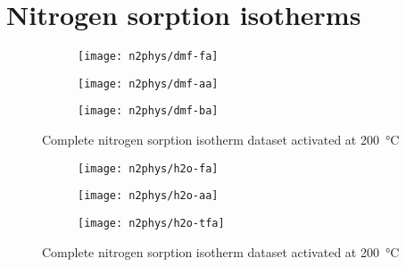 
\section{Nitrogen sorption isotherms}


\begin{figure}[htb]
    \centering

    \begin{subfigure}{0.4\linewidth}
        \texttt{[image: n2phys/dmf-fa]}%
        \label{appx:def:fgr:n2phys-dmf-fa}
    \end{subfigure}
    \begin{subfigure}{0.4\linewidth}
        \texttt{[image: n2phys/dmf-aa]}%
        \label{appx:def:fgr:n2phys-dmf-aa}
    \end{subfigure}
    
    \begin{subfigure}{0.4\linewidth}
        \texttt{[image: n2phys/dmf-ba]}%
        \label{appx:def:fgr:n2phys-dmf-ba}
    \end{subfigure}

    \caption{Complete nitrogen sorption isotherm dataset activated at \SI{200}{\degreeCelsius}}%
    \label{appx:def:fgr:n2phys-dataset}
    
\end{figure}
\begin{figure}[htb]\ContinuedFloat{}
    \centering

    \begin{subfigure}{0.4\linewidth}
        \texttt{[image: n2phys/h2o-fa]}%
        \label{appx:def:fgr:n2phys-h2o-fa}
    \end{subfigure}

    \begin{subfigure}{0.4\linewidth}
        \texttt{[image: n2phys/h2o-aa]}%
        \label{appx:def:fgr:n2phys-h2o-aa}
    \end{subfigure}
    
    \begin{subfigure}{0.4\linewidth}
        \texttt{[image: n2phys/h2o-tfa]}%
        \label{appx:def:fgr:n2phys-h2o-tfa}
    \end{subfigure}

    \caption{Complete nitrogen sorption isotherm dataset activated at \SI{200}{\degreeCelsius}}%
    
\end{figure}
